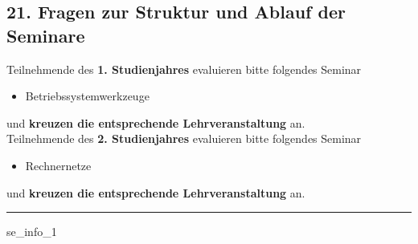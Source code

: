 \documentclass[a4paper,10pt]{article}
\makeatletter
\def\saveenum{\xdef\@savedenum{\the\c@enumi\relax}}
\makeatother
\begin{document}
{\begin{enumerate}
\end{enumerate} \saveenum

\vspace{-1cm}


\pagebreak



\subsection*{21. Fragen zur Struktur und Ablauf der Seminare}

Teilnehmende des \textbf{1. Studienjahres} evaluieren bitte folgendes Seminar
\begin{itemize}
	\item Betriebssystemwerkzeuge
\end{itemize}
und \textbf{kreuzen die entsprechende Lehrveranstaltung} an. \\

Teilnehmende des \textbf{2. Studienjahres} evaluieren bitte folgendes Seminar
\begin{itemize}
	\item Rechnernetze
\end{itemize}
und \textbf{kreuzen die entsprechende Lehrveranstaltung} an.

\vspace{.5cm}
\noindent\rule{\textwidth}{1pt}
\vspace{0.5cm}

\begin{questionmult}{se_info_1}
	\begin{choices}
	\end{choices}
\end{questionmult}


 \\

\begin{enumerate}


\end{enumerate}}
\end{document}

